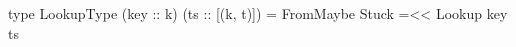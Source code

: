 \begin{code}
type LookupType (key :: k) (ts :: [(k, t)]) =
  FromMaybe Stuck =<< Lookup key ts
\end{code}
